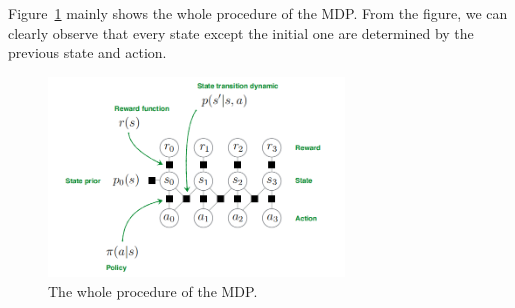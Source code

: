 \documentclass[11pt]{article}
\begin{document}
Figure~\ref{fig:process} mainly shows the whole procedure of the MDP. From the figure, we can clearly observe that every state except the initial one are determined by the previous state and action.
\begin{figure}[H]
\centering
    \includegraphics[width=0.7\textwidth]{process.png}
    \caption{The whole procedure of the MDP.}
	\label{fig:process}
\end{figure}
\end{document}
